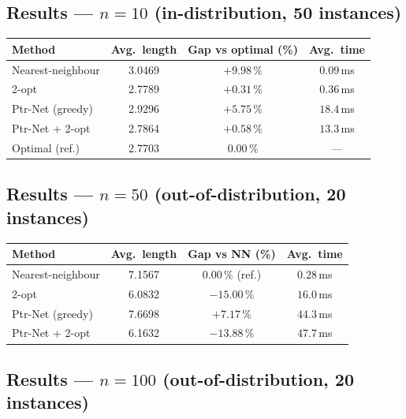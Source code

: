 \documentclass[12pt,a4paper]{article}
\begin{document}
\subsection*{Results — $n = 10$ (in-distribution, 50 instances)}

\begin{center}
\begin{tabularx}{\linewidth}{Xccc}
\toprule
\textbf{Method} & \textbf{Avg.\ length} & \textbf{Gap vs optimal (\%)} & \textbf{Avg.\ time} \\
\midrule
Nearest-neighbour & 3.0469 & $+9.98\,\%$ & $0.09$\,ms \\
2-opt             & 2.7789 & $+0.31\,\%$ & $0.36$\,ms \\
Ptr-Net (greedy)  & 2.9296 & $+5.75\,\%$ & $18.4$\,ms \\
Ptr-Net + 2-opt   & 2.7864 & $+0.58\,\%$ & $13.3$\,ms \\
Optimal (ref.)    & 2.7703 & $0.00\,\%$  & ---         \\
\bottomrule
\end{tabularx}
\end{center}

\subsection*{Results — $n = 50$ (out-of-distribution, 20 instances)}

\begin{center}
\begin{tabularx}{\linewidth}{Xccc}
\toprule
\textbf{Method} & \textbf{Avg.\ length} & \textbf{Gap vs NN (\%)} & \textbf{Avg.\ time} \\
\midrule
Nearest-neighbour & 7.1567 & $0.00\,\%$ (ref.) & $0.28$\,ms \\
2-opt             & 6.0832 & $-15.00\,\%$      & $16.0$\,ms \\
Ptr-Net (greedy)  & 7.6698 & $+7.17\,\%$       & $44.3$\,ms \\
Ptr-Net + 2-opt   & 6.1632 & $-13.88\,\%$      & $47.7$\,ms \\
\bottomrule
\end{tabularx}
\end{center}

\subsection*{Results — $n = 100$ (out-of-distribution, 20 instances)}
\end{document}
